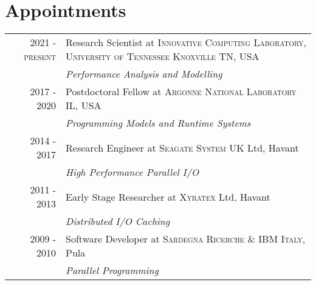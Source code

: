 \documentclass[a4paper,10pt]{article}
\begin{document}
\section{Appointments}
\begin{tabular}{rp{11cm}}
\textsc{2021 - present} & Research Scientist at \textsc{Innovative Computing Laboratory, University of Tennessee Knoxville} TN, USA \\
         & \emph{Performance Analysis and Modelling} \\

\textsc{2017 - 2020} & Postdoctoral Fellow at \textsc{Argonne National Laboratory} IL, USA \\
         & \emph{Programming Models and Runtime Systems}\\

\textsc{2014 - 2017} & Research Engineer at \textsc{Seagate System UK} Ltd, Havant \\
         & \emph{High Performance Parallel I/O}\\

\textsc{2011 - 2013} & Early Stage Researcher at \textsc{Xyratex} Ltd, Havant \\
         & \emph{Distributed I/O Caching}\\

\textsc{2009 - 2010} & Software Developer at \textsc{Sardegna Ricerche \& IBM Italy}, Pula \\
         & \emph{Parallel Programming}
\end{tabular}

%
\end{document}
